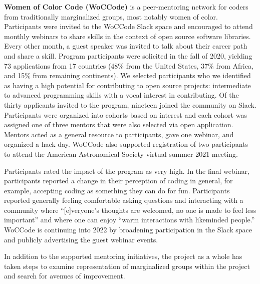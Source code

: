 \documentclass[modern]{aastex631}
\begin{document}
\textbf{Women of Color Code (WoCCode)} is a peer-mentoring network for
coders from traditionally marginalized groups, most notably women of
color. Participants were invited to the WoCCode Slack space and
encouraged to attend monthly webinars to share skills in the context
of open source software libraries. Every other month, a guest speaker
was invited to talk about their career path and share a skill. Program
participants were solicited in the fall of 2020, yielding 73
applications from 17 countries (48\% from the United States, 37\% from
Africa, and 15\% from remaining continents). We selected participants
who we identified as having a high potential for contributing to open
source projects: intermediate to advanced programming skills with a
vocal interest in contributing. Of the thirty applicants invited to
the program, nineteen joined the community on Slack. Participants were
organized into cohorts based on interest and each cohort was assigned
one of three mentors that were also selected via open
application. Mentors acted as a general resource to participants, gave
one webinar, and organized a hack day. WoCCode also supported
registration of two participants to attend the American Astronomical
Society virtual summer 2021 meeting.

Participants rated the impact of the program as very high. In the
final webinar, participants reported a change in their perception of
coding in general, for example, accepting coding as something they can
do for fun. Participants reported generally feeling comfortable asking
questions and interacting with a community where ``[e]veryone's
thoughts are welcomed, no one is made to feel less important'' and
where one can enjoy ``warm interactions with likeminded people.''
WoCCode is continuing into 2022 by broadening participation in the
Slack space and publicly advertising the guest webinar events.

In addition to the supported mentoring initiatives, the \astropy
project as a whole has taken steps to examine representation of
marginalized groups within the project and search for avenues of
improvement.
\end{document}
